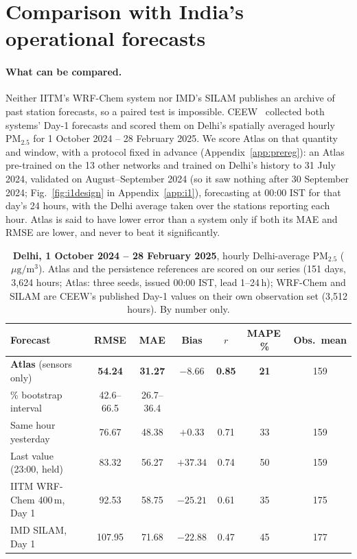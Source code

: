 \documentclass{article}
\newcommand{\pmu}{\ensuremath{\mu\mathrm{g/m^3}}}
\newcommand{\pmtf}{PM$_{2.5}$}
\newcommand{\IoneMAEci}{26.7--36.4}\newcommand{\IoneRMSEci}{42.6--66.5}
\begin{document}
\section{Comparison with India's operational forecasts}
\label{sec:ops}

\paragraph{What can be compared.} Neither IITM's WRF-Chem system nor IMD's SILAM publishes an archive of past station
forecasts, so a paired test is impossible. CEEW~\citep{ceew2025} collected both systems' Day-1 forecasts and scored them
on Delhi's spatially averaged hourly \pmtf{} for 1 October 2024 -- 28 February 2025. We score Atlas on that quantity and
window, with a protocol fixed in advance (Appendix~\ref{app:prereg}): an Atlas pre-trained on the 13 other networks and
trained on Delhi's history to 31 July 2024, validated on August--September 2024 (so it saw nothing after 30 September
2024; Fig.~\ref{fig:i1design} in Appendix~\ref{app:i1}), forecasting at 00:00 IST for that day's 24 hours, with the Delhi
average taken over the stations reporting each hour. Atlas is said to have lower error than a system only if both its
MAE and RMSE are lower, and never to beat it significantly.

\begin{table}[t]
\caption{\textbf{Delhi, 1 October 2024 -- 28 February 2025}, hourly Delhi-average \pmtf{} (\pmu). Atlas and the
persistence references are scored on our series (151 days, 3{,}624 hours; Atlas: three seeds, issued 00:00 IST, lead
1--24\,h); WRF-Chem and SILAM are CEEW's published Day-1 values on their own observation set (3{,}512 hours). By
number only.}
\label{tab:i1}
\centering\small
\setlength{\tabcolsep}{3.5pt}
\begin{tabular}{lcccccc}
\toprule
Forecast & RMSE & MAE & Bias & $r$ & MAPE\,\% & Obs.\ mean \\
\midrule
\textbf{Atlas} (sensors only) & \textbf{54.24} & \textbf{31.27} & $-8.66$ & \textbf{0.85} & \textbf{21} & 159 \\
\quad 95\% bootstrap interval & \IoneRMSEci & \IoneMAEci & & & & \\
Same hour yesterday & 76.67 & 48.38 & $+0.33$ & 0.71 & 33 & 159 \\
Last value (23:00, held) & 83.32 & 56.27 & $+37.34$ & 0.74 & 50 & 159 \\
\midrule
IITM WRF-Chem 400\,m, Day 1 & 92.53 & 58.75 & $-25.21$ & 0.61 & 35 & 175 \\
IMD SILAM, Day 1 & 107.95 & 71.68 & $-22.88$ & 0.47 & 45 & 177 \\
\bottomrule
\end{tabular}
\end{table}
\end{document}
